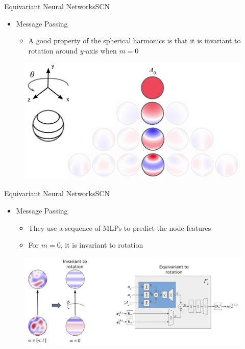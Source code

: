 \documentclass[pdf,serif]{beamer}
\begin{document}
\begin{frame}{Equivariant Neural Networks}{SCN}
    \begin{itemize}
        \item Message Passing
        \begin{itemize}
            \item A good property of the spherical harmonics is that it is invariant to rotation around $y$-axis when $m=0$
        \end{itemize}
    \end{itemize}
    \vspace*{1em}
    \begin{figure}
        \includegraphics[width=.7\linewidth]{images/rot2}
    \end{figure}
\end{frame}

\begin{frame}{Equivariant Neural Networks}{SCN}
    \begin{itemize}
        \item Message Passing
        \begin{itemize}
            \item They use a sequence of MLPs to predict the node features 
            \item For $m=0$, it is invariant to rotation
        \end{itemize}
    \end{itemize}
    \vspace*{1em}
    \begin{figure}
        \includegraphics[width=.9\linewidth]{images/rot3}
    \end{figure}
\end{frame}
\end{document}
